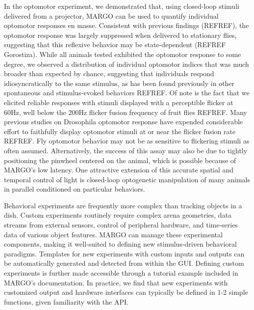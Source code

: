 \documentclass[10pt]{article}
\begin{document}
\begin{multicols}{2}
In the optomotor experiment, we demonstrated that, using closed-loop stimuli delivered from a projector, MARGO can be used to quantify individual optomotor responses en masse. Consistent with previous findings (REFREF), the optomotor response was largely suppressed when delivered to stationary flies, suggesting that this reflexive behavior may be state-dependent (REFREF Gorostiza). While all animals tested exhibited the optomotor response to some degree, we observed a distribution of individual optomotor indices that was much broader than expected by chance, suggesting that individuals respond idiosyncratically to the same stimulus, as has been found previously in other spontaneous and stimulus-evoked behaviors REFREF. Of note is the fact that we elicited reliable responses with stimuli displayed with a perceptible flicker at 60Hz, well below the 200Hz flicker fusion frequency of fruit flies REFREF. Many previous studies on Drosophila optomotor response have expended considerable effort to faithfully display optomotor stimuli at or near the flicker fusion rate REFREF. Fly optomotor behavior may not be as sensitive to flickering stimuli as often assumed. Alternatively, the success of this assay may also be due to tightly positioning the pinwheel centered on the animal, which is possible because of MARGO's low latency. One attractive extension of this accurate spatial and temporal control of light is closed-loop optogenetic manipulation of many animals in parallel conditioned on particular behaviors.

Behavioral experiments are frequently more complex than tracking objects in a dish. Custom experiments routinely require complex arena geometries, data streams from external sensors, control of peripheral hardware, and time-series data of various object features. MARGO can manage these experimental components, making it well-suited to defining new stimulus-driven behavioral paradigms. Templates for new experiments with custom inputs and outputs can be automatically generated and detected from within the GUI. Defining custom experiments is further made accessible through a tutorial example included in MARGO's documentation. In practice, we find that new experiments with customized output and hardware interfaces can typically be defined in 1-2 simple functions, given familiarity with the API.


\end{multicols}
\end{document}
